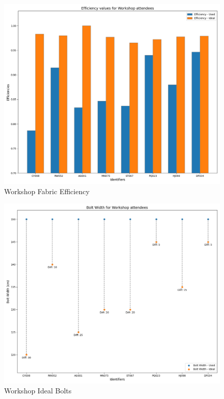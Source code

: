 \begin{figure} [htb]
    \centering
    \includegraphics[width = \textwidth]{Images/Workshop_Eff_bar.png}
    \caption{Workshop Fabric Efficiency}
\end{figure}
\begin{figure} [htb]
    \centering
    \includegraphics[width = \textwidth]{Images/Workshop_BoltWidths_Scatter.png}
    \caption{Workshop Ideal Bolts}
\end{figure}

